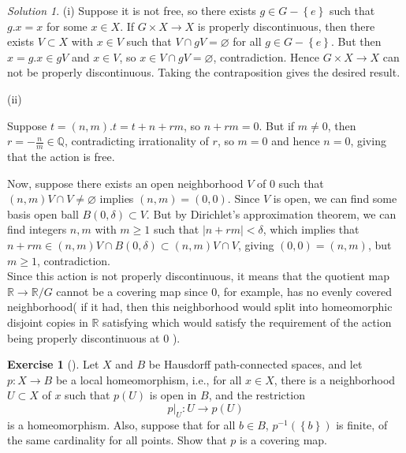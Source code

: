 \documentclass[reqno]{amsart}
\theoremstyle{definition}
\newtheorem{exercise}[theorem]{Exercise}
\theoremstyle{remark}
\newtheorem*{solution}{Solution}
\begin{document}
    \begin{solution}
        (i) 
        Suppose it is not free, so there exists $g \in G -
        \left\{ e \right\} $ such
        that $g.x = x$ for some $x \in X$. If
        $G \times X \to X$ is properly discontinuous, then
        there exists $V \subset X$ with $x \in V$ such that
        $V \cap gV = \varnothing$ for all 
        $g \in G - \left\{ e \right\} $. But then
        $x = g.x \in gV$ and $x \in V$, so
        $x \in V \cap gV = \varnothing$, contradiction. Hence
        $G \times X \to X$ can not be properly discontinuous. Taking
        the contraposition gives the desired result.

        (ii)
        
        Suppose $t = (n,m).t = t + n + rm $, so
        $n + rm = 0$. But if $m\neq 0$, then
        $r = -\frac{n}{m} \in \mathbb{Q}$, contradicting irrationality
        of $r$, so $m = 0$ and hence $n = 0$, giving that
        the action is free. 

        Now, suppose there exists an open neighborhood
        $V$ of $0$ such that
        $\left( n,m \right) V \cap V \neq \varnothing$ implies
        $\left( n,m \right)  = (0,0)$. Since $V$ is open,
        we can find some basis open ball $B\left( 0,
        \delta \right) \subset V$. But by Dirichlet's
        approximation theorem, we can find integers
        $n,m$ with $m\ge 1$ such that
        $\left| n + rm \right| < \delta$, which implies that
        $n+rm \in (n,m) V \cap B\left( 0, \delta \right) 
        \subset (n,m) V \cap V$, giving
        $ (0,0) = \left( n,m \right) $, but
        $m \ge 1$, contradiction.\\
        \linebreak
        Since this action is not properly discontinuous, it
        means that the quotient map
        $\mathbb{R} \to  \mathbb{R} /G$ cannot be a covering
        map since $0$, for example, has no evenly covered neighborhood(
        if it had, then this neighborhood would split
        into homeomorphic disjoint copies in $\mathbb{R}$ 
        satisfying which would satisfy the requirement of
        the action being properly discontinuous at  $0$ ).


        \begin{exercise}[]
            Let $X$ and $B$ be Hausdorff path-connected
            spaces, and let $p \colon X \to B$ be a
            local homeomorphism, i.e., for all $x \in X$,
            there is a neighborhood $U \subset X$ of
            $x$ such that $p(U)$ is open in $B$, and
            the restriction
            \[
            p|_{U} \colon U \to p(U)
            \] 
            is a homeomorphism. Also, suppose that for all
            $b \in B$, $p^{-1}\left( \left\{ b \right\}  \right) $ 
            is finite, of the same cardinality for all
            points. Show that $p$ is a covering map.
        \end{exercise}


\end{solution}
\end{document}
